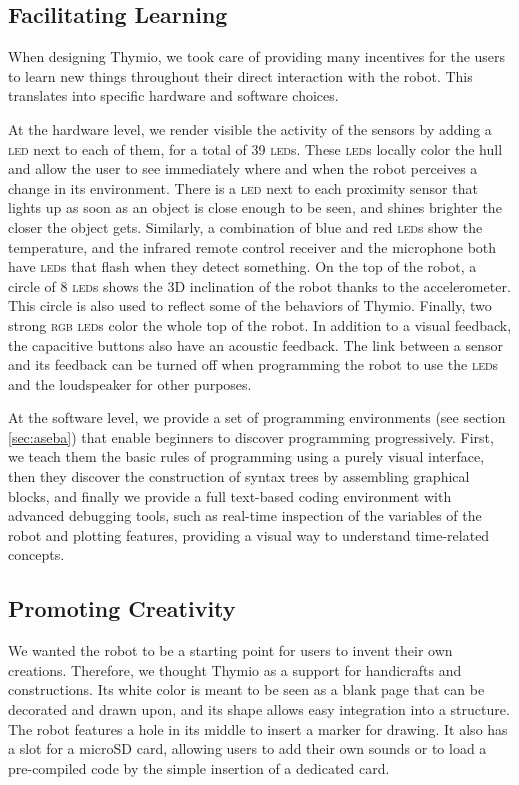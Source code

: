 \documentclass[letterpaper, 10 pt, conference]{ieeeconf}  %
\begin{document}
\subsection{Facilitating Learning}

When designing Thymio, we took care of providing many incentives for the users to learn new things throughout their direct interaction with the robot.
This translates into specific hardware and software choices.

At the hardware level, we render visible the activity of the sensors by adding a \textsc{led} next to each of them, for a total of 39 \textsc{led}s.
These \textsc{led}s locally color the hull and allow the user to see immediately where and when the robot perceives a change in its environment.
There is a \textsc{led} next to each proximity sensor that lights up as soon as an object is close enough to be seen, and shines brighter the closer the object gets.
Similarly, a combination of blue and red \textsc{led}s show the temperature, and the infrared remote control receiver and the microphone both have \textsc{led}s that flash when they detect something.
On the top of the robot, a circle of 8 \textsc{led}s shows the 3D inclination of the robot thanks to the accelerometer. 
This circle is also used to reflect some of the behaviors of Thymio.
Finally, two strong \textsc{rgb} \textsc{led}s color the whole top of the robot.
In addition to a visual feedback, the capacitive buttons also have an acoustic feedback.
The link between a sensor and its feedback can be turned off when programming the robot to use the \textsc{led}s and the loudspeaker for other purposes.

At the software level, we provide a set of programming environments (see section \ref{sec:aseba}) that enable beginners to discover programming progressively.
First, we teach them the basic rules of programming using a purely visual interface, then they discover the construction of syntax trees by assembling graphical blocks, and finally we provide a full text-based coding environment with advanced debugging tools, such as real-time inspection of the variables of the robot and plotting features, providing a visual way to understand time-related concepts.

\subsection{Promoting Creativity}
\label{sec:crea}

We wanted the robot to be a starting point for users to invent their own creations.
Therefore, we thought Thymio as a support for handicrafts and constructions.
Its white color is meant to be seen as a blank page that can be decorated and drawn upon, and its shape allows easy integration into a structure.
The robot features a hole in its middle to insert a marker for drawing.
It also has a slot for a microSD card, allowing users to add their own sounds or to load a pre-compiled code by the simple insertion of a dedicated card.
\end{document}
